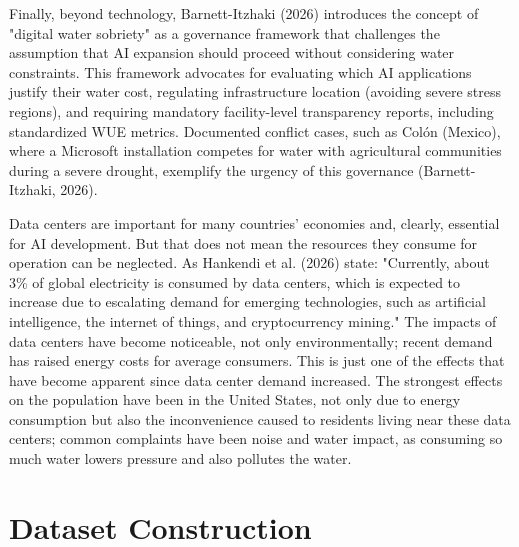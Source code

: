 \documentclass[conference]{IEEEtran}
\begin{document}
Finally, beyond technology, Barnett-Itzhaki (2026) introduces the concept of "digital water sobriety" as a governance framework that challenges the assumption that AI expansion should proceed without considering water constraints. This framework advocates for evaluating which AI applications justify their water cost, regulating infrastructure location (avoiding severe stress regions), and requiring mandatory facility-level transparency reports, including standardized WUE metrics. Documented conflict cases, such as Colón (Mexico), where a Microsoft installation competes for water with agricultural communities during a severe drought, exemplify the urgency of this governance (Barnett-Itzhaki, 2026).

Data centers are important for many countries' economies and, clearly, essential for AI development. But that does not mean the resources they consume for operation can be neglected. As Hankendi et al. (2026) state: "Currently, about 3\% of global electricity is consumed by data centers, which is expected to increase due to escalating demand for emerging technologies, such as artificial intelligence, the internet of things, and cryptocurrency mining." The impacts of data centers have become noticeable, not only environmentally; recent demand has raised energy costs for average consumers. This is just one of the effects that have become apparent since data center demand increased. The strongest effects on the population have been in the United States, not only due to energy consumption but also the inconvenience caused to residents living near these data centers; common complaints have been noise and water impact, as consuming so much water lowers pressure and also pollutes the water.

\section{Dataset Construction}
\end{document}

